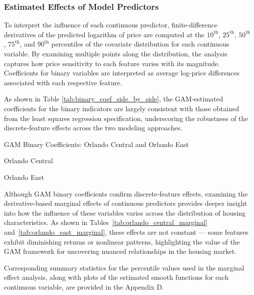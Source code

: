 \subsubsection*{Estimated Effects of Model Predictors}

To interpret the influence of each continuous predictor, finite-difference derivatives of the predicted logarithm of price are computed at the $10^{\text{th}}$, $25^{\text{th}}$, $50^{\text{th}}$, $75^{\text{th}}$, and $90^{\text{th}}$ percentiles of the covariate distribution for each continuous variable. By examining multiple points along the distribution, the analysis captures how price sensitivity to each feature varies with its magnitude. Coefficients for binary variables are interpreted as average log-price differences associated with each respective feature.


As shown in Table \ref{tab:binary_coef_side_by_side}, the GAM‑estimated coefficients for the binary indicators are largely consistent with those obtained from the least squares regression specification, underscoring the robustness of the discrete‑feature effects across the two modeling approaches.

\begin{table}[htbp]
\centering
\caption{GAM Binary Coefficients: Orlando Central and Orlando East}
\label{tab:binary_coef_side_by_side}
\begin{minipage}[t]{0.48\textwidth}
\centering
\caption*{Orlando Central}

\end{minipage}%
\hfill
\begin{minipage}[t]{0.48\textwidth}
\centering
\caption*{Orlando East}

\end{minipage}
\end{table}

Although GAM binary coefficients confirm discrete-feature effects, examining the derivative-based marginal effects of continuous predictors provides deeper insight into how the influence of these variables varies across the distribution of housing characteristics. As shown in Tables~\ref{tab:orlando_central_marginal} and~\ref{tab:orlando_east_marginal}, these effects are not constant --- some features exhibit diminishing returns or nonlinear patterns, highlighting the value of the GAM framework for uncovering nuanced relationships in the housing market.

Corresponding summary statistics for the percentile values used in the marginal effect analysis, along with plots of the estimated smooth functions for each continuous variable, are provided in the Appendix D.

